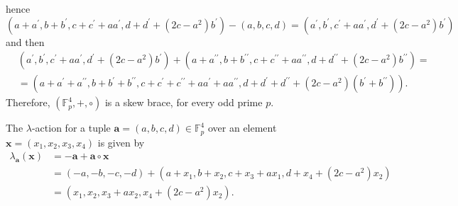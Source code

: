 \documentclass{amsart}
\theoremstyle{definition}
\begin{document}
hence
\[
(a+a^\prime, b + b^\prime, c+c^\prime+aa^\prime, d+d^\prime+(2c-a^2)b^\prime)-(a,b,c,d)= (a^\prime,b^\prime,c^\prime+aa^\prime,d^\prime+(2c-a^2)b^\prime)
\]
and then
\begin{align*}
&(a^\prime,b^\prime,c^\prime+aa^\prime,d^\prime+(2c-a^2)b^\prime) + (a+a^{\prime\prime}, b + b^{\prime\prime}, c+c^{\prime\prime}+aa^{\prime\prime}, d+d^{\prime\prime}+(2c-a^2)b^{\prime\prime}) =\\
&=(a+a^\prime+a^{\prime\prime},b+b^\prime + b^{\prime\prime},c+c^\prime +c^{\prime\prime}+aa^\prime + aa^{\prime\prime},d+d^\prime +d^{\prime\prime}+(2c-a^2)(b^\prime+b^{\prime\prime})).
\end{align*}
Therefore, $(\mathbb{F}_p^4,+,\circ)$ is a skew brace, for every odd prime $p$. \medskip

The $\lambda$-action for a tuple $\mathbf{a}=(a,b,c,d) \in \mathbb{F}^4_p$ over an element $\mathbf{x}=(x_1,x_2,x_3,x_4)$ is given by 
\begin{align*}
    \lambda_\mathbf{a}(\mathbf{x})&=-\mathbf{a}+ \mathbf{a} \circ \mathbf{x} \\
    &=(-a,-b,-c,-d) + (a+x_1,b+x_2,c+x_3+ax_1, d+x_4+(2c-a^2)x_2) \\
    &=(x_1,x_2,x_3+ax_2,x_4+(2c-a^2)x_2).
\end{align*}
\end{document}
